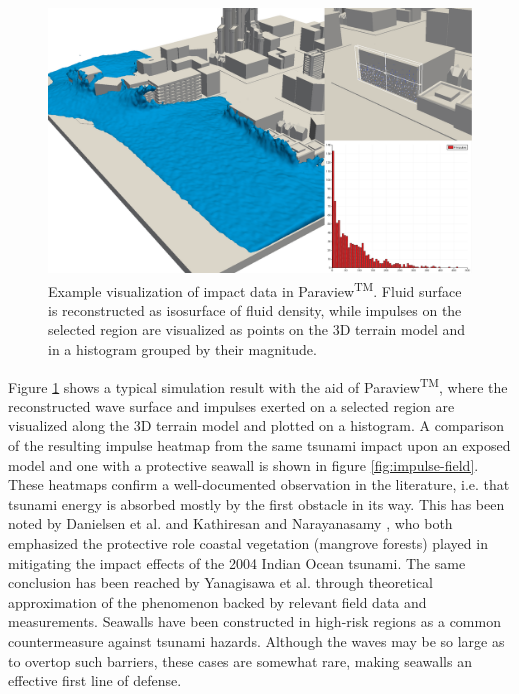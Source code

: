 \documentclass{llncs}
\begin{document}
\begin{figure}[h!]
  \includegraphics[width=\textwidth]{figures/paraview.png}
  \caption{Example visualization of impact data in Paraview\textsuperscript{TM}. Fluid
    surface is reconstructed as isosurface of fluid density, while impulses on the
    selected region are vi\-su\-a\-li\-zed as points on the 3D terrain model and in a
    histogram grouped by their magnitude.}
  \label{fig:visualization}
\end{figure}

Figure \ref{fig:visualization} shows a typical simulation result with the aid of
Paraview\textsuperscript{TM}, where the reconstructed wave surface and impulses exerted on
a selected region are visualized along the 3D terrain model and plotted on a histogram. A
comparison of the resulting impulse heatmap from the same tsunami impact upon an exposed
model and one with a protective seawall is shown in figure \ref{fig:impulse-field}. These
heatmaps confirm a well-documented observation in the literature, i.e. that tsunami energy
is absorbed mostly by the first obstacle in its way. This has been noted by Danielsen et
al. \cite{danielsen2005asian} and Kathiresan and Narayanasamy \cite{kathiresan2005601},
who both emphasized the protective role coastal vegetation (mangrove forests) played in
mitigating the impact effects of the 2004 Indian Ocean tsunami. The same conclusion has
been reached by Yanagisawa et al. \cite{yanagisawa200927} through theoretical
approximation of the phenomenon backed by relevant field data and measurements. Seawalls
have been constructed in high-risk regions as a common countermeasure against tsunami
hazards. Although the waves may be so large as to overtop such barriers, these cases are
somewhat rare, making seawalls an effective first line of defense.
\end{document}
